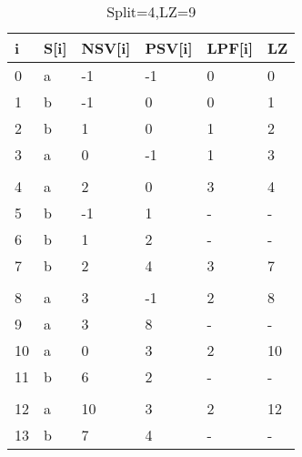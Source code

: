 \begin{table}[h]
\begin{tabular}{@{}llllll@{}}
\toprule
i  & S{[}i{]} & NSV{[}i{]} & PSV{[}i{]} & LPF{[}i{]} & LZ \\ \midrule
0  & a        & -1         & -1         & 0          & 0  \\
1  & b        & -1         & 0          & 0          & 1  \\
2  & b        & 1          & 0          & 1          & 2  \\
3  & a        & 0          & -1         & 1          & 3  \\
   &          &            &            &            &    \\
4  & a        & 2          & 0          & 3          & 4  \\
5  & b        & -1         & 1          & -          & -  \\
6  & b        & 1          & 2          & -          & -  \\
7  & b        & 2          & 4          & 3          & 7  \\
   &          &            &            &            &    \\
8  & a        & 3          & -1         & 2          & 8  \\
9  & a        & 3          & 8          & -          & -  \\
10 & a        & 0          & 3          & 2          & 10 \\
11 & b        & 6          & 2          & -          & -  \\
   &          &            &            &            &    \\
12 & a        & 10         & 3          & 2          & 12 \\
13 & b        & 7          & 4          & -          & -  \\ \bottomrule
\end{tabular}
\caption{Split=4,LZ=9}
\label{my-label}
\end{table}

